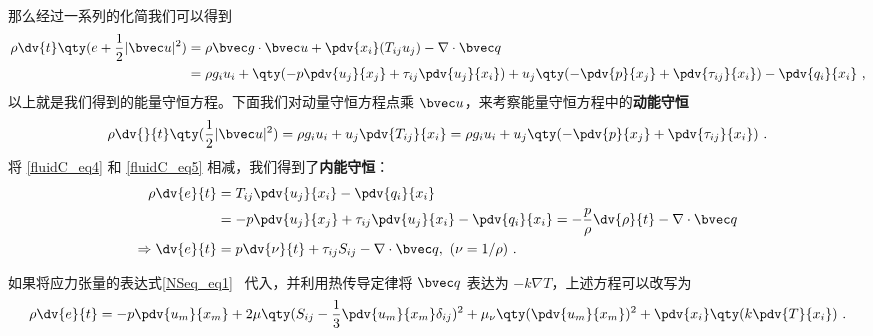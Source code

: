 那么经过一系列的化简我们可以得到
\begin{equation}\label{fluidC_eq4}
\begin{aligned}
\rho \dv{t} \qty(e+\frac{1}{2}|\bvec u|^2)&=\rho \bvec g\cdot \bvec u+\pdv{x_i} (T_{ij}u_j)-\nabla\cdot \bvec q\\
&=\rho g_iu_i+\qty(-p\pdv{u_j}{x_j}+\tau_{ij}\pdv{u_j}{x_i})+u_j\qty(-\pdv{p}{x_j}+\pdv{\tau_{ij}}{x_i})-\pdv{q_i}{x_i}~,
\end{aligned}
\end{equation}
以上就是我们得到的能量守恒方程。下面我们对动量守恒方程点乘 $\bvec u$，来考察能量守恒方程中的\textbf{动能守恒}
\begin{equation}\label{fluidC_eq5}
\rho \dv{}{t}\qty(\frac{1}{2}|\bvec u|^2)=\rho g_iu_i+u_j\pdv{T_{ij}}{x_i}=\rho g_iu_i+u_j\qty(-\pdv{p}{x_j}+\pdv{\tau_{ij}}{x_i})~.
\end{equation}
将 \autoref{fluidC_eq4} 和 \autoref{fluidC_eq5} 相减，我们得到了\textbf{内能守恒}：
\begin{equation}
\begin{aligned}
\rho \dv{e}{t}&=T_{ij}\pdv{u_j}{x_i}-\pdv{q_i}{x_i}
\\&=-p\pdv{u_j}{x_j}+\tau_{ij}\pdv{u_j}{x_i}-\pdv{q_i}{x_i}=-\frac{p}{\rho}\dv{\rho}{t}-\nabla\cdot \bvec q\\
\Rightarrow \dv{e}{t}&=p\dv{\nu}{t}+\tau_{ij}S_{ij}-\nabla\cdot \bvec q,\ (\nu=1/\rho)~.\\
\end{aligned}
\end{equation}

如果将应力张量的表达式\autoref{NSeq_eq1}~ 代入，并利用热传导定律将 $\bvec q$ 表达为 $-k\nabla T$，上述方程可以改写为
\begin{equation}\label{fluidC_eq7}
\rho \dv{e}{t}=-p\pdv{u_m}{x_m}+2\mu\qty(S_{ij}-\frac{1}{3}\pdv{u_m}{x_m}\delta_{ij})^2+\mu_\nu\qty(\pdv{u_m}{x_m})^2+\pdv{x_i}\qty(k\pdv{T}{x_i})~.
\end{equation}
